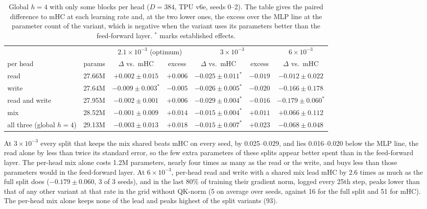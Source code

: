 \documentclass[11pt, a4paper]{article}
\newcommand{\lr}[1]{\ensuremath{#1 \times 10^{-3}}}
\newcommand{\est}{^{\ast}}
\begin{document}
\begin{table}[ht]
  \centering
  \caption{Global $h = 4$ with only some blocks per head ($D = 384$, TPU v6e, seeds 0--2). The table gives the paired difference to
    mHC at each learning rate and, at the two lower ones, the excess over the MLP line at the parameter count of the variant, which
    is negative when the variant uses its parameters better than the feed-forward layer. $\est$ marks established effects.}
  \label{tab:parts}
  \small
  \setlength{\tabcolsep}{3.5pt}
  \begin{tabular}{lrccccc}
    \toprule
    & & \multicolumn{2}{c}{\lr{2.1} (optimum)} & \multicolumn{2}{c}{\lr{3}} & \lr{6} \\
    \cmidrule(lr){3-4} \cmidrule(lr){5-6} \cmidrule(lr){7-7}
    per head & params & $\Delta$ vs.\ mHC & excess & $\Delta$ vs.\ mHC & excess & $\Delta$ vs.\ mHC \\
    \midrule
    read & 27.66M & $+0.002 \pm 0.015$ & $+0.006$ & $-0.025 \pm 0.011\est$ & $-0.019$ & $-0.012 \pm 0.022$ \\
    write & 27.64M & $-0.009 \pm 0.003\est$ & $-0.005$ & $-0.026 \pm 0.005\est$ & $-0.020$ & $-0.166 \pm 0.178$ \\
    read and write & 27.95M & $-0.002 \pm 0.001$ & $+0.006$ & $-0.029 \pm 0.004\est$ & $-0.016$ & $-0.179 \pm 0.060\est$ \\
    mix & 28.52M & $-0.001 \pm 0.009$ & $+0.014$ & $-0.015 \pm 0.004\est$ & $+0.011$ & $+0.066 \pm 0.112$ \\
    all three (global $h = 4$) & 29.13M & $-0.003 \pm 0.013$ & $+0.018$ & $-0.015 \pm 0.007\est$ & $+0.023$ & $-0.068 \pm 0.048$ \\
    \bottomrule
  \end{tabular}
\end{table}

At \lr{3} every split that keeps the mix shared beats mHC on every seed, by 0.025--0.029, and lies 0.016--0.020 below the MLP line,
the read alone by less than twice its standard error, so the few extra parameters of these splits appear better spent than in the
feed-forward layer. The per-head mix alone costs 1.2M parameters, nearly four
times as many as the read or the write, and buys less than those parameters would in the feed-forward layer. At \lr{6}, per-head
read and write with a shared mix lead mHC by 2.6 times as much as the full split does ($-0.179 \pm 0.060$, 3 of 3 seeds), and in the
last 80\% of training their gradient norm, logged every 25th step, peaks lower than that of any other variant at that rate in the grid without QK-norm (5 on average over seeds,
against 16 for the full split and 51 for mHC). The per-head mix alone keeps none of the lead and peaks highest of the split variants (93).
\end{document}

